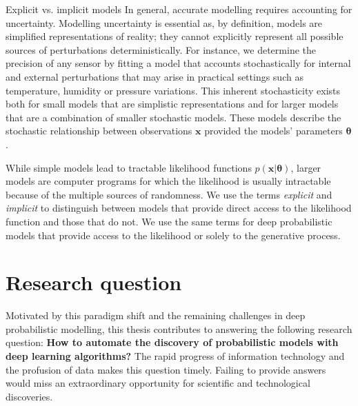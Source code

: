 \begin{side_note}{Explicit vs. implicit models}
  In general, accurate modelling requires accounting for uncertainty. Modelling uncertainty is essential as, by definition, models are simplified representations of reality; they cannot explicitly represent all possible sources of perturbations deterministically.
  For instance, we determine the precision of any sensor by fitting a model that accounts stochastically for internal and external perturbations that may arise in practical settings such as temperature, humidity or pressure variations. This inherent stochasticity exists both for small models that are simplistic representations and for larger models that are a combination of smaller stochastic models. These models describe the stochastic relationship between observations $\mathbf{x}$ provided the models' parameters $\mathbf{\theta}$. %

  While simple models lead to tractable likelihood functions $p(\mathbf{x}|\mathbf{\theta})$, larger models are computer programs for which the likelihood is usually intractable because of the multiple sources of randomness. We use the terms \textit{explicit} and \textit{implicit} to distinguish between models that provide direct access to the likelihood function and those that do not. We use the same terms for deep probabilistic models that provide access to the likelihood or solely to the generative process.
\end{side_note}
\section{Research question}

Motivated by this paradigm shift and the remaining challenges in deep probabilistic modelling, this thesis contributes to answering the following research question: \textbf{How to automate the discovery of probabilistic models with deep learning algorithms?} The rapid progress of information technology and the profusion of data makes this question timely. Failing to provide answers would miss an extraordinary opportunity for scientific and technological discoveries.

